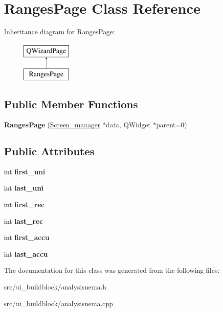 \hypertarget{classRangesPage}{}\section{Ranges\+Page Class Reference}
\label{classRangesPage}
Inheritance diagram for Ranges\+Page\+:\begin{figure}[H]
\begin{center}
\leavevmode
\includegraphics[height=2.000000cm]{classRangesPage}
\end{center}
\end{figure}
\subsection*{Public Member Functions}
\begin{DoxyCompactItemize}
\item 
\mbox{\label{classRangesPage_a7ac86bf3827efab70bea60b11cf35e52}} 
{\bfseries Ranges\+Page} (\mbox{\hyperlink{classScreen__manager}{Screen\+\_\+manager}} $\ast$data, Q\+Widget $\ast$parent=0)
\end{DoxyCompactItemize}
\subsection*{Public Attributes}
\begin{DoxyCompactItemize}
\item 
\mbox{\label{classRangesPage_a2335a0389c9fbcb68a2f135e7658a78f}} 
int {\bfseries first\+\_\+uni}
\item 
\mbox{\label{classRangesPage_a90a1f4d609d5cd6ef4c738f3d517ed52}} 
int {\bfseries last\+\_\+uni}
\item 
\mbox{\label{classRangesPage_a80c883a326370013e247db88f1965255}} 
int {\bfseries first\+\_\+rec}
\item 
\mbox{\label{classRangesPage_a82cd083c725a783ddd81a77d1e33f029}} 
int {\bfseries last\+\_\+rec}
\item 
\mbox{\label{classRangesPage_a11569a471d0f639646d26597387973f5}} 
int {\bfseries first\+\_\+accu}
\item 
\mbox{\label{classRangesPage_ae19968bffc75506ff92201e6052b4e6d}} 
int {\bfseries last\+\_\+accu}
\end{DoxyCompactItemize}


The documentation for this class was generated from the following files\+:\begin{DoxyCompactItemize}
\item 
src/ui\+\_\+buildblock/analysisnema.\+h\item 
src/ui\+\_\+buildblock/analysisnema.\+cpp\end{DoxyCompactItemize}
